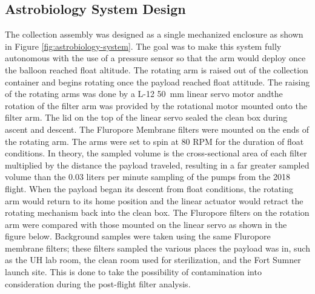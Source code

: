 \subsection{Astrobiology System Design}
\label{sec:Astrobiology-Design}

The collection assembly was designed as a single mechanized enclosure as shown in Figure \ref{fig:astrobiology-system}. The goal was to make this system fully autonomous with the use of a pressure sensor so that the arm would deploy once the balloon reached float altitude.  The rotating arm is raised out of the collection container and begins rotating once the payload reached float attitude. The raising of the rotating arms was done by a L-12 \SI{50}{\milli\meter} linear servo motor andthe rotation of the filter arm was provided by the rotational motor mounted onto the filter arm.  The lid on the top of the linear servo sealed the clean box during ascent and descent.  The Fluropore Membrane filters were mounted on the ends of the rotating arm.  The arms were set to spin at 80 RPM for the duration of float conditions.  In theory, the sampled volume is the cross-sectional area of each filter multiplied by the distance the payload traveled, resulting in a far greater sampled volume than the 0.03 liters per minute sampling of the pumps from the 2018 flight. When the payload began its descent from float conditions, the rotating arm would return to its home position and the linear actuator would retract the rotating mechanism back into the clean box.  The Fluropore filters on the rotation arm were compared with those mounted on the linear servo as shown in the figure below.  Background samples were taken using the same Fluropore membrane filters; these filters sampled the various places the payload was in, such as the UH lab room, the clean room used for sterilization, and the Fort Sumner launch site. This is done to take the possibility of contamination into consideration during the post-flight filter analysis.

